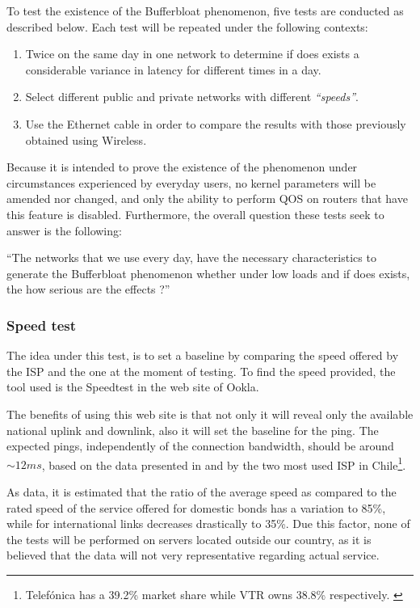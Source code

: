 To test the existence of the Bufferbloat phenomenon, five tests are conducted 
as described below. Each test will be repeated under the following contexts:

\begin{enumerate}
\item Twice on the same day in one network to determine if does exists a 
considerable variance in latency for different times in a day.
\item Select different public and private networks with different 
\textit{``speeds''}.
\item Use the Ethernet cable in order to compare the results with those 
previously obtained using Wireless.
\end{enumerate}

Because it is intended to prove the existence of the phenomenon under
circumstances experienced by everyday users, no kernel parameters will be
amended nor changed, and only the  ability to perform QOS on routers that have
this feature is disabled.  Furthermore, the overall question these tests seek
to answer is the following:

\begin{theoremnon}[] 
``The networks that we use every day, have the necessary characteristics to
generate the  Bufferbloat phenomenon whether under low loads and if does
exists, the how  serious are the effects ?''
\end{theoremnon}

\subsubsection{Speed test} 
The idea under this test, is to set a baseline by comparing the speed offered 
by the ISP and the one at the moment of testing. To find the speed provided, 
the  tool used is the Speedtest in the web site of Ookla.

The benefits of using this web site is that not only it will reveal only
the available national uplink and downlink, also it will set the baseline
for the ping. The expected pings, independently of the connection bandwidth,
should be around $\sim12ms$, based on the data presented in \cite{netvtr} and
\cite{netmov} by the two most used ISP in Chile\footnote{Telef\'onica has a
39.2\% market share while VTR owns 38.8\% respectively. \cite{ispshares}}.

As data, it is estimated that the ratio of the average speed as compared to the
rated speed of the service offered for domestic bonds has a variation to 85\%,
while for international links decreases drastically to 35\%\cite{modcompqos}.
Due this factor, none of the tests will be performed on servers located outside
our country, as it is believed that the data will not very representative
regarding actual service.


